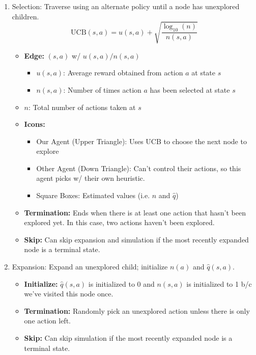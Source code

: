 \begin{algo}
    \begin{enumerate}
        \item Selection: Traverse using an alternate policy until a node has unexplored children. 
        \begin{equation}
            \text{UCB}(s,a) = u(s,a) + \sqrt{\frac{\log_{10}(n)}{n(s,a)}}
        \end{equation}
        \begin{itemize}
            \item \textbf{Edge:} $(s,a)$ w/ $u(s,a)/n(s,a)$
            \begin{itemize}
                \item $u(s,a)$: Average reward obtained from action $a$ at state $s$
                \item $n(s,a)$: Number of times action $a$ has been selected at state $s$
            \end{itemize}
            \item $n$: Total number of actions taken at $s$
        \end{itemize}
        \begin{itemize}
            \item \textbf{Icons:}
            \begin{itemize}
                \item Our Agent (Upper Triangle): Uses UCB to choose the next node to explore
                \item Other Agent (Down Triangle): Can't control their actions, so this agent picks w/ their own heuristic.
                \item Square Boxes: Estimated values (i.e. $n$ and $\hat{q}$)
            \end{itemize}
            \item \textbf{Termination:} Ends when there is at least one action that hasn't been explored yet. In this case, two actions haven't been explored. 
            \item \textbf{Skip:} Can skip expansion and simulation if the most recently expanded node is a terminal state.
        \end{itemize}
        \item Expansion: Expand an unexplored child; initialize $n(a)$ and $\hat{q}(s,a)$.
        \begin{itemize}
            \item \textbf{Initialize:} $\hat{q}(s,a)$ is initialized to 0 and $n(s,a)$ is initialized to 1 b/c we've visited this node once.
            \item \textbf{Termination:} Randomly pick an unexplored action unless there is only one action left.
            \item \textbf{Skip:} Can skip simulation if the most recently expanded node is a terminal state. 
        \end{itemize}
    \end{enumerate}
\end{algo}

